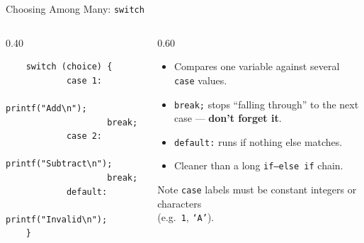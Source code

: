 \documentclass[aspectratio=169]{beamer}
\begin{document}
	\begin{frame}[fragile]{Choosing Among Many: \texttt{switch}}
		\begin{columns}[T]
			\begin{column}{0.40\textwidth}
\begin{lstlisting}
	switch (choice) {
			case 1:
					printf("Add\n");
					break;
			case 2:
					printf("Subtract\n");
					break;
			default:
					printf("Invalid\n");
	}
\end{lstlisting}
			\end{column}
			\begin{column}{0.60\textwidth}
				\begin{itemize}\small
					\item Compares one variable against several \texttt{case} values.
					\item \texttt{break;} stops ``falling through'' to the next case --- \textbf{don't forget it}.
					\item \texttt{default:} runs if nothing else matches.
					\item Cleaner than a long \texttt{if--else if} chain.
				\end{itemize}
				\begin{block}{Note}
					\small \texttt{case} labels must be constant integers or characters \\ (e.g.\ \texttt{1}, \texttt{`A'}).
				\end{block}
			\end{column}
		\end{columns}
	\end{frame}
	
\end{document}
